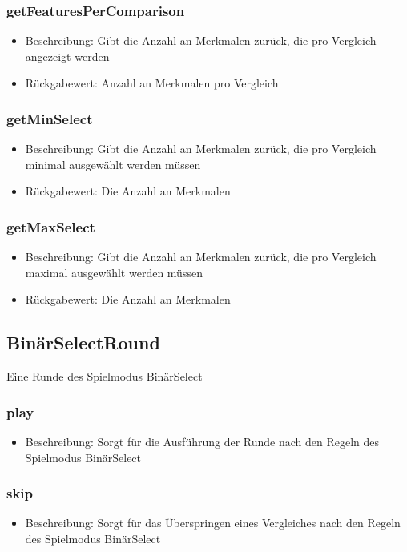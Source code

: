 \documentclass[a4paper]{scrreprt}
\begin{document}
   \subsubsection{getFeaturesPerComparison}
      \begin{itemize}
      \item Beschreibung: Gibt die Anzahl an Merkmalen zurück, die pro Vergleich angezeigt werden
      \item Rückgabewert: Anzahl an Merkmalen pro Vergleich
      \end{itemize}
   \subsubsection{getMinSelect}
      \begin{itemize}
      \item Beschreibung: Gibt die Anzahl an Merkmalen zurück, die pro Vergleich minimal ausgewählt werden müssen
      \item Rückgabewert: Die Anzahl an Merkmalen
      \end{itemize}
   \subsubsection{getMaxSelect}
      \begin{itemize}
      \item Beschreibung: Gibt die Anzahl an Merkmalen zurück, die pro Vergleich maximal ausgewählt werden müssen
      \item Rückgabewert: Die Anzahl an Merkmalen
      \end{itemize}
   
    
   \subsection{BinärSelectRound}
   Eine Runde des Spielmodus BinärSelect
   \subsubsection{play}
      \begin{itemize}
      \item Beschreibung: Sorgt für die Ausführung der Runde nach den Regeln des Spielmodus BinärSelect
      \end{itemize}
   \subsubsection{skip}
      \begin{itemize}
      \item Beschreibung: Sorgt für das Überspringen eines Vergleiches nach den Regeln des Spielmodus BinärSelect
      \end{itemize}
   
\end{document}
